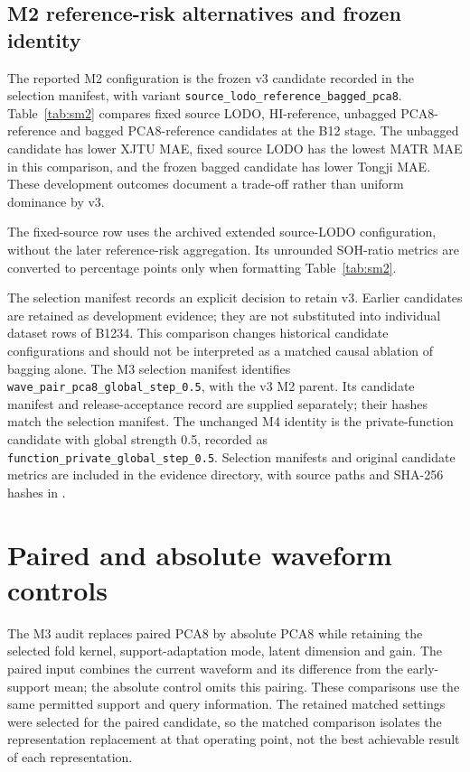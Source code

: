 \documentclass[11pt,a4paper]{article}
\begin{document}
\subsection{M2 reference-risk alternatives and frozen identity}
The reported M2 configuration is the frozen v3 candidate recorded in the selection manifest, with variant \texttt{source\_lodo\_reference\_bagged\_pca8}. Table~\ref{tab:sm2} compares fixed source LODO, HI-reference, unbagged PCA8-reference and bagged PCA8-reference candidates at the B12 stage. The unbagged candidate has lower XJTU MAE, fixed source LODO has the lowest MATR MAE in this comparison, and the frozen bagged candidate has lower Tongji MAE. These development outcomes document a trade-off rather than uniform dominance by v3.



The fixed-source row uses the archived extended source-LODO configuration, without the later reference-risk aggregation. Its unrounded SOH-ratio metrics are converted to percentage points only when formatting Table~\ref{tab:sm2}.

The selection manifest records an explicit decision to retain v3. Earlier candidates are retained as development evidence; they are not substituted into individual dataset rows of B1234. This comparison changes historical candidate configurations and should not be interpreted as a matched causal ablation of bagging alone. The M3 selection manifest identifies \texttt{wave\_pair\_pca8\_global\_step\_0.5}, with the v3 M2 parent. Its candidate manifest and release-acceptance record are supplied separately; their hashes match the selection manifest. The unchanged M4 identity is the private-function candidate with global strength 0.5, recorded as \texttt{function\_private\_global\_step\_0.5}. Selection manifests and original candidate metrics are included in the evidence directory, with source paths and SHA-256 hashes in .

\section{Paired and absolute waveform controls}
\label{sec:swaveform}
The M3 audit replaces paired PCA8 by absolute PCA8 while retaining the selected fold kernel, support-adaptation mode, latent dimension and gain. The paired input combines the current waveform and its difference from the early-support mean; the absolute control omits this pairing. These comparisons use the same permitted support and query information. The retained matched settings were selected for the paired candidate, so the matched comparison isolates the representation replacement at that operating point, not the best achievable result of each representation.
\end{document}
